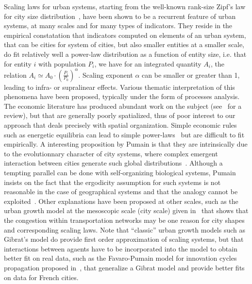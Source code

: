Scaling laws for urban systems, starting from the well-known rank-size Zipf's law for city size distribution~\cite{gabaix1999zipf}, have been shown to be a recurrent feature of urban systems, at many scales and for many types of indicators. They reside in the empirical constatation that indicators computed on elements of an urban system, that can be cities for system of cities, but also smaller entities at a smaller scale, do fit relatively well a power-law distribution as a function of entity size, i.e. that for entity $i$ with population $P_i$, we have for an integrated quantity $A_i$, the relation $A_i \simeq A_0\cdot \left(\frac{P_i}{P_0}\right)^{\alpha}$. Scaling exponent $\alpha$ can be smaller or greater than 1, leading to infra- or supralinear effects. Various thematic interpretation of this phenomena have been proposed, typically under the form of processes analysis. The economic literature has produced abundant work on the subject (see~\cite{Gabaix20042341} for a review), but that are generally poorly spatialized, thus of poor interest to our approach that deals precisely with spatial organization. Simple economic rules such as energetic equilibria can lead to simple power-laws~\cite{bettencourt2008large} but are difficult to fit empirically. A interesting proposition by Pumain is that they are intrinsically due to the evolutionnary character of city systems, where complex emergent interaction between cities generate such global distributions~\cite{pumain2006evolutionary}. Although a tempting parallel can be done with self-organizing biological systems, Pumain insists on the fact that the ergodicity assumption for such systems is not reasonable in the case of geographical systems and that the analogy cannot be exploited~\cite{pumain2012urban}. Other explanations have been proposed at other scales, such as the urban growth model at the mesoscopic scale (city scale) given in~\cite{2014arXiv1401.8200L} that shows that the congestion within transportation networks may be one reason for city shapes and corresponding scaling laws. Note that ``classic'' urban growth models such as Gibrat's model do provide first order approximation of scaling systems, but that interactions between agaents have to be incorporated into the model to obtain better fit on real data, such as the Favaro-Pumain model for innovation cycles propagation proposed in~\cite{favaro2011gibrat}, that generalize a Gibrat model and provide better fits on data for French cities.

